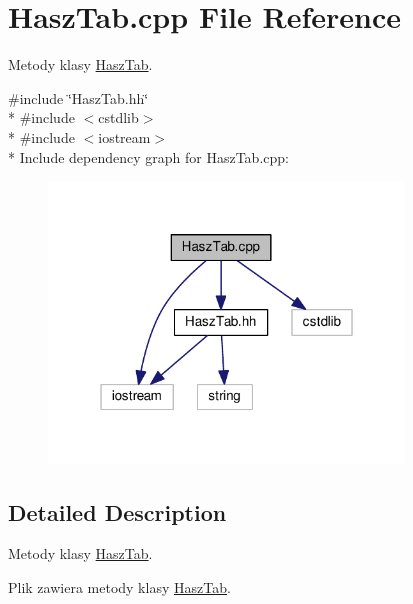 \hypertarget{a00011}{}\section{Hasz\+Tab.\+cpp File Reference}
\label{a00011}


Metody klasy \hyperlink{a00003}{Hasz\+Tab}.  


{\ttfamily \#include \char`\"{}Hasz\+Tab.\+hh\char`\"{}}\\*
{\ttfamily \#include $<$cstdlib$>$}\\*
{\ttfamily \#include $<$iostream$>$}\\*
Include dependency graph for Hasz\+Tab.\+cpp\+:\nopagebreak
\begin{figure}[H]
\begin{center}
\leavevmode
\includegraphics[width=268pt]{a00028}
\end{center}
\end{figure}


\subsection{Detailed Description}
Metody klasy \hyperlink{a00003}{Hasz\+Tab}. 

Plik zawiera metody klasy \hyperlink{a00003}{Hasz\+Tab}. 